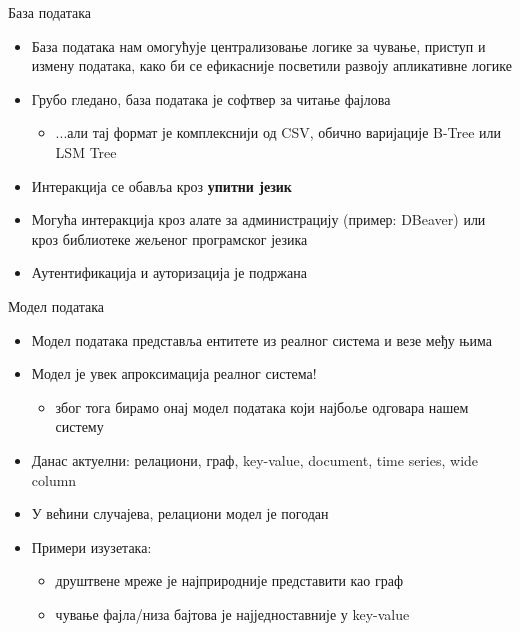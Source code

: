 \documentclass{beamer}
\begin{document}
    \begin{frame}{База података}
        \begin{itemize}
            \item База података нам омогућује централизовање логике за чување, приступ и измену података, како би се ефикасније посветили развоју апликативне логике
            \item Грубо гледано, база података је софтвер за читање фајлова
            \begin{itemize}
                \item ...али тај формат је комплекснији од CSV, обично варијације B-Tree или LSM Tree
            \end{itemize}
            \item Интеракција се обавља кроз \textbf{упитни језик}
            \item Могућа интеракција кроз алате за администрацију (пример: DBeaver) или кроз библиотеке жељеног програмског језика
            \item Аутентификација и ауторизација је подржана
        \end{itemize}
    \end{frame}
    
    \begin{frame}{Модел података}
        \begin{itemize}
            \item Модел података представља ентитете из реалног система и везе међу њима
            \item Модел је увек апроксимација реалног система!
            \begin{itemize}
                \item због тога бирамо онај модел података који најбоље одговара нашем систему
            \end{itemize}
            \item Данас актуелни: релациони, граф, key-value, document, time series, wide column
            \item У већини случајева, релациони модел је погодан
            \item Примери изузетака:
            \begin{itemize}
                \item друштвене мреже је најприродније представити као граф
                \item чување фајла/низа бајтова је најједноставније у key-value
            \end{itemize}
        \end{itemize}
    \end{frame}
    
\end{document}
